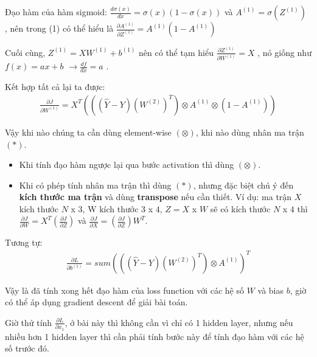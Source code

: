 Đạo hàm của hàm sigmoid: $\frac{d\sigma(x)}{dx} = \sigma(x)  (1 - \sigma(x))$ và $A^{(1)} = \sigma(Z^{(1)})$ , nên trong (1) có thể hiểu là $\frac{\partial A^{(1)}}{\partial Z^{(1)}} = A^{(1)} (1 - A^{(1)})$

Cuối cùng, $Z^{(1)} = X  W^{(1)} + b^{(1)}$ nên có thể tạm hiểu $\frac{\partial Z^{(1)}}{\partial W^{(1)}} = X$ , nó giống như $f(x)= ax +b$ $ \rightarrow \frac{df}{dx} = a$ .

Kết hợp tất cả lại ta được:
\begin{align}
\frac{\partial J}{\partial W^{(1)}} = X^T  (((\hat{Y} - Y)  (W^{(2)})^T)\otimes A^{(1)}\otimes (1-A^{(1)}) ) 
\end{align}

Vậy khi nào chúng ta cần dùng element-wise $(\otimes)$, khi nào dùng nhân ma trận $(*)$.
\begin{itemize}
\item Khi tính đạo hàm ngược lại qua bước activation thì dùng $(\otimes)$.
\item Khi có phép tính nhân ma trận thì dùng $(*)$, nhưng đặc biệt chú ý đến \textbf{kích thước ma trận} và dùng \textbf{transpose} nếu cần thiết. Ví dụ: ma trận $X$ kích thước $N$ x $3$, W kích thước $3$ x $4$, $Z = X$ x $W$ sẽ có kích thước $N$ x $4$ thì $\frac{\partial J}{\partial W} = X^T (\frac{\partial J}{\partial Z})$ và $\frac{\partial J}{\partial X} = (\frac{\partial J}{\partial Z})W^T$.
\end{itemize}
Tương tự: 
\begin{align}
\frac{\partial L}{\partial b^{(1)}} = sum(((\hat{Y} - Y) (W^{(2)})^T)\otimes A^{(1)})^T
\end{align}

Vậy là đã tính xong hết đạo hàm của loss function với các hệ số $W$ và bias $b$, giờ có thể áp dụng gradient descent để giải bài toán.

Giờ thử tính $ \frac{\partial L}{\partial x_1}$, ở bài này thì không cần vì chỉ có 1 hidden layer, nhưng nếu nhiều hơn 1 hidden layer thì cần phải tính bước này để tính đạo hàm với các hệ số trước đó.

